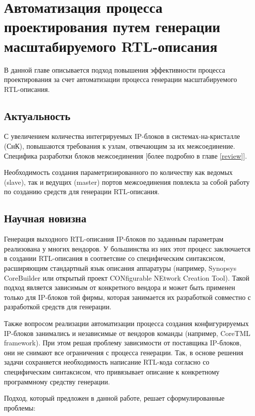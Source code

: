 
\chapter{Автоматизация процесса проектирования путем генерации масштабируемого RTL-описания} \label{generation}

В данной главе описывается подход повышения эффективности процесса проектирования за счет автоматизации процесса генерации масштабируемого RTL-описания.

\section{Актуальность}

С увеличением количества интегрируемых IP-блоков в системах-на-кристалле (СнК), повышаются требования к узлам, отвечающим за их межсоединение.
Специфика разработки блоков межсоединения [более подробно в главе \ref{review}].

Необходимость создания параметризированного по количеству как ведомых (slave), так и ведущих (master) портов межсоединения повлекла за собой работу по созданию средств для генерации RTL-описания.

\section{Научная новизна}

Генерация выходного RTL-описания IP-блоков по заданным параметрам реализована у многих вендоров. У большинства из них этот процесс заключается в создании RTL-описания в соответсвие со специфическим синтаксисом, расширяющим стандартный язык описания аппаратуры (например, Synopsys CoreBuilder или открытый проект CONfigurable NEtwork Creation Tool). Такой подход является зависимым от конкретного вендора и может быть применен только для IP-блоков той фирмы, которая занимается их разработкой совместно с разработкой средств для генерации.

Также вопросом реализации автоматизации процесса создания конфигурируемых IP-блоков занимались и независимые от вендоров команды (например, CoreTML framework). При этом решая проблему зависимости от поставщика IP-блоков, они не снимают все ограничения с процесса генерации. Так, в основе решения задачи сохраняется необходимость написание RTL-кода согласно со специфическим синтаксисом, что привязывает описание к конкретному программному средству генерации.

Подход, который предложен в данной работе, решает сформулированные проблемы:

